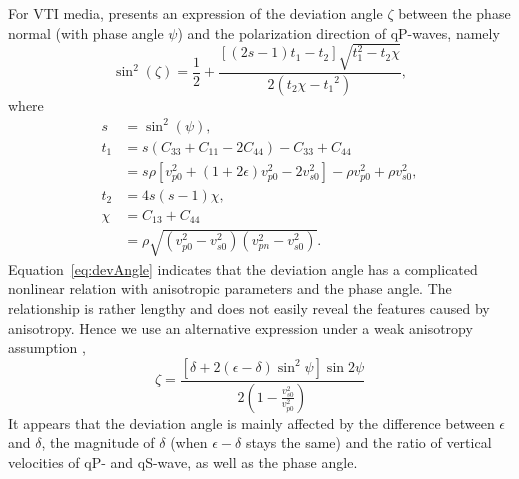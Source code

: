 
For VTI media,  \cite{dellinger.thesis} presents an expression of the deviation angle $\zeta$ between the phase normal
(with phase angle $\psi$) and the polarization direction of qP-waves, namely
\begin{equation}
\label{eq:devAngle}
\sin^2(\zeta)=\frac{1}{2}+\frac{[(2s-1)t_{1}-t_{2}]\sqrt{t_{1}^2-t_{2}\chi}}{2(t_{2}\chi-{t_{1}}^2)},
\end{equation}
where
\begin{equation}
\begin{split}
s & =  \sin^2(\psi), \\
t_{1} & =  s(C_{33}+C_{11}-2C_{44})-C_{33}+C_{44} \\
      & =  s\rho[v_{p0}^2+(1+2\epsilon)v_{p0}^2-2v_{s0}^2]-\rho{v_{p0}^2}+\rho{v_{s0}^2}, \\
t_{2} & =  4s(s-1)\chi, \\
\chi & =  C_{13}+C_{44} \\ 
     & =  \rho\sqrt{(v_{p0}^2-v_{s0}^2)(v_{pn}^2-v_{s0}^2)}.
\end{split}
\end{equation}
Equation~\ref{eq:devAngle} indicates that the deviation angle has a complicated nonlinear relation with anisotropic parameters 
and the phase angle. The relationship is rather lengthy and does not easily reveal the features caused by anisotropy.
 Hence we use an alternative expression under a weak anisotropy assumption \cite[]{rommel:1994, tsvankin:2001},
\begin{equation}
\zeta=\frac{[\delta+2(\epsilon-\delta)\sin^2{\psi}]\sin{2\psi}}{2(1-\frac{v_{s0}^2}{v_{p0}^2})}
\end{equation}
It appears that the deviation angle is mainly affected by the difference between $\epsilon$ and $\delta$,
 the magnitude of $\delta$ (when $\epsilon-\delta$ stays the same) and the ratio of vertical velocities of
 qP- and qS-wave, as well as the phase angle.

